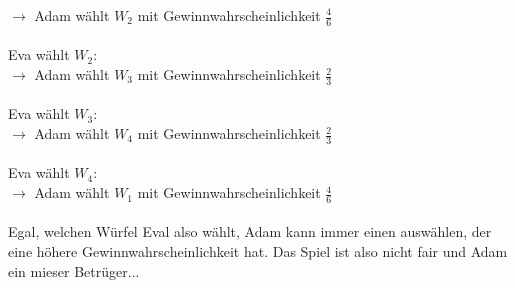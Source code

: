 \documentclass[a4paper]{scrartcl}
\begin{document}
$\rightarrow$ Adam wählt $W_2$ mit Gewinnwahrscheinlichkeit $\frac{4}{6}$
\\
\\
Eva wählt $W_2$:\\
$\rightarrow$ Adam wählt $W_3$ mit Gewinnwahrscheinlichkeit $\frac{2}{3}$
\\
\\
Eva wählt $W_3$:\\
$\rightarrow$ Adam wählt $W_4$ mit Gewinnwahrscheinlichkeit $\frac{2}{3}$
\\
\\
Eva wählt $W_4$:\\
$\rightarrow$ Adam wählt $W_1$ mit Gewinnwahrscheinlichkeit $\frac{4}{6}$
\\
\\
Egal, welchen Würfel Eval also wählt, Adam kann immer einen auswählen, der eine höhere Gewinnwahrscheinlichkeit hat. Das Spiel ist also nicht fair und Adam ein mieser Betrüger...
\end{document}
